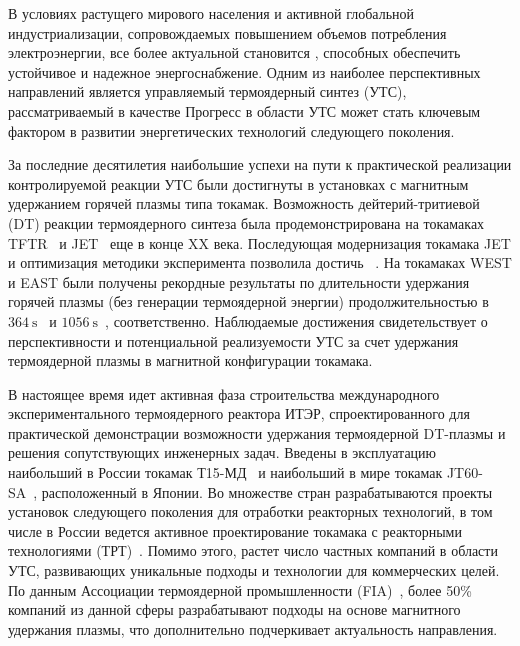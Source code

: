 
{\actuality} В условиях растущего мирового населения и активной глобальной индустриализации, сопровождаемых повышением объемов потребления электроэнергии,
все более актуальной становится , способных обеспечить устойчивое и надежное энергоснабжение.  Одним из наиболее перспективных направлений является управляемый термоядерный синтез (УТС), рассматриваемый в качестве  Прогресс в области УТС может стать ключевым фактором в развитии энергетических технологий следующего поколения.

За последние десятилетия наибольшие успехи на пути к практической реализации контролируемой реакции УТС были достигнуты в установках с магнитным удержанием горячей плазмы типа токамак. Возможность  дейтерий-тритиевой (DT) реакции термоядерного синтеза была продемонстрирована на токамаках TFTR~\cite{Skinner1997} и JET~\cite{Keilhacker1999} еще в конце XX века. Последующая модернизация токамака JET и оптимизация методики эксперимента позволила достичь ~\cite{Maggi2024,Kappatou2025}. На токамаках WEST и EAST были получены рекордные результаты по длительности удержания горячей плазмы (без генерации термоядерной энергии) продолжительностью в \(\SI{364}{\second}\)~\cite{Shi2025} и \(\SI{1056}{\second}\)~\cite{Gong2024}, соответственно. Наблюдаемые достижения свидетельствует о перспективности и потенциальной реализуемости УТС за счет удержания термоядерной плазмы в магнитной конфигурации токамака.

В настоящее время идет активная фаза строительства международного экспериментального термоядерного реактора ИТЭР, спроектированного для практической демонстрации возможности  удержания термоядерной DT-плазмы и решения сопутствующих инженерных задач. Введены в эксплуатацию наибольший в России токамак Т15-МД~\cite{Velikhov2024} и наибольший в мире токамак JT60-SA~\cite{Shirai2024}, расположенный в Японии. Во множестве стран разрабатываются проекты установок следующего поколения для отработки реакторных технологий, в том числе в России ведется активное проектирование токамака с реакторными технологиями (ТРТ)~\cite{Krasilnikov2021}. Помимо этого, растет число частных компаний в области УТС, развивающих уникальные подходы и технологии для коммерческих целей. По данным Ассоциации термоядерной промышленности (FIA)~\cite{FIA}, более 50\% компаний из данной сферы разрабатывают подходы на основе магнитного удержания плазмы, что дополнительно подчеркивает актуальность направления.

